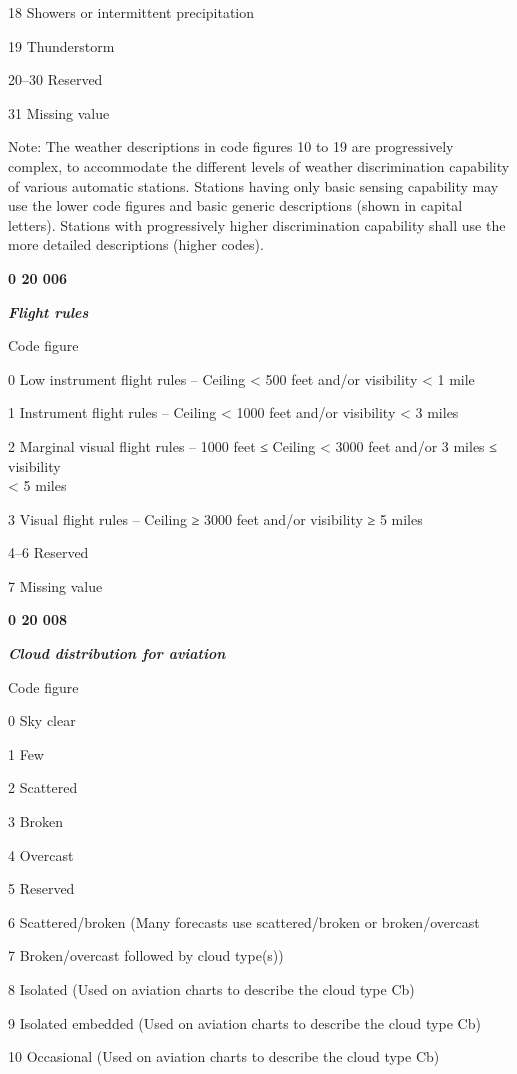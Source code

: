18 Showers or intermittent precipitation

19 Thunderstorm

20--30 Reserved

31 Missing value

Note: The weather descriptions in code figures 10 to 19 are progressively complex, to accommodate the different levels of weather discrimination capability of various automatic stations. Stations having only basic sensing capability may use the lower code figures and basic generic descriptions (shown in capital letters). Stations with progressively higher discrimination capability shall use the more detailed descriptions (higher codes).

\textbf{0 20 006}

\emph{\textbf{Flight rules}}

Code figure

0 Low instrument flight rules -- Ceiling \textless{} 500 feet and/or visibility \textless{} 1 mile

1 Instrument flight rules -- Ceiling \textless{} 1000 feet and/or visibility \textless{} 3 miles

2 Marginal visual flight rules -- 1000 feet ≤ Ceiling \textless{} 3000 feet and/or 3 miles ≤ visibility\\
\textless{} 5 miles

3 Visual flight rules -- Ceiling ≥ 3000 feet and/or visibility ≥ 5 miles

4--6 Reserved

7 Missing value

\textbf{0 20 008}

\emph{\textbf{Cloud distribution for aviation}}

Code figure

0 Sky clear

1 Few

2 Scattered

3 Broken

4 Overcast

5 Reserved

6 Scattered/broken (Many forecasts use scattered/broken or broken/overcast

7 Broken/overcast followed by cloud type(s))

8 Isolated (Used on aviation charts to describe the cloud type Cb)

9 Isolated embedded (Used on aviation charts to describe the cloud type Cb)

10 Occasional (Used on aviation charts to describe the cloud type Cb)

